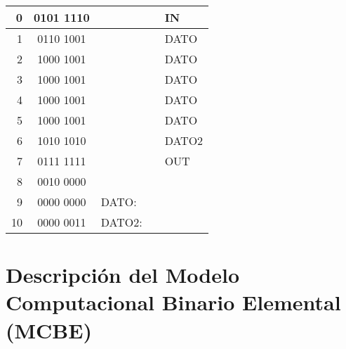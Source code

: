 \documentclass[12pt]{article}
\begin{document}
\begin{enumerate}
\begin{enumerate}
\begin{enumerate}
\begin{tabular}{r||c||l|l|l}
                    0 & 0101 1110 &  &  & IN\\ \hline
                    1 & 0110 1001 &  &  & DATO\\ \hline
                    2 & 1000 1001 &  &  & DATO\\ \hline
                    3 & 1000 1001 &  &  & DATO\\ \hline
                    4 & 1000 1001 &  &  & DATO\\ \hline
                    5 & 1000 1001 &  &  & DATO\\ \hline
                    6 & 1010 1010 &  &  & DATO2\\ \hline
                    7 & 0111 1111 &  &  & OUT\\ \hline
                    8 & 0010 0000 &  &  & \\ \hline
                    9 & 0000 0000 & DATO: &  & \\ \hline
                    10 & 0000 0011 & DATO2: &  & \\ \hline

                \end{tabular}

            \end{enumerate}
        \end{enumerate}


\end{enumerate}

\appendix
\clearpage
\addappheadtotoc
\appendixpage

\section*{Descripción del Modelo Computacional Binario Elemental (MCBE)}
\end{document}
